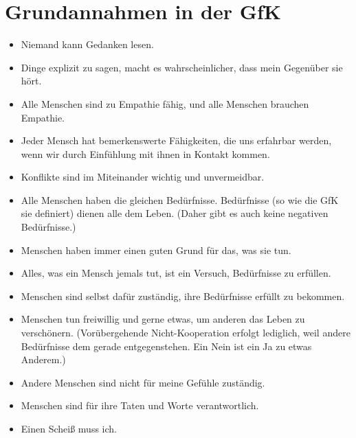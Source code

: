 \section{Grundannahmen in der GfK}
\label{gfk-annahmen}

\begin{itemize}
    \item Niemand kann Gedanken lesen.
    \item Dinge explizit zu sagen, macht es wahrscheinlicher, dass mein Gegenüber sie hört.
    \item Alle Menschen sind zu Empathie fähig, und alle Menschen brauchen Empathie.
    \item Jeder Mensch hat bemerkenswerte Fähigkeiten, die uns erfahrbar werden, wenn wir durch Einfühlung mit ihnen in Kontakt kommen.
    \item Konflikte sind im Miteinander wichtig und unvermeidbar.
    \item Alle Menschen haben die gleichen Bedürfnisse. Bedürfnisse (so wie die GfK sie definiert) dienen alle dem Leben. (Daher gibt es auch keine negativen Bedürfnisse.)
    \item Menschen haben immer einen guten Grund für das, was sie tun.
    \item Alles, was ein Mensch jemals tut, ist ein Versuch, Bedürfnisse zu erfüllen.
    \item Menschen sind selbst dafür zuständig, ihre Bedürfnisse erfüllt zu bekommen.
    \item Menschen tun freiwillig und gerne etwas, um anderen das Leben zu verschönern. (Vorübergehende Nicht-Kooperation erfolgt lediglich, weil andere Bedürfnisse dem gerade entgegenstehen. \glqq Ein Nein ist ein Ja zu etwas Anderem.\glqq)
    \item Andere Menschen sind nicht für meine Gefühle zuständig.
    \item Menschen sind für ihre Taten und Worte verantwortlich.
    \item Einen Scheiß muss ich.
\end{itemize}

